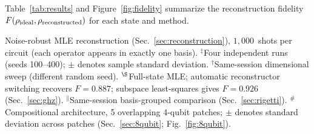 \documentclass[twocolumn,prx,aps,superscriptaddress,longbibliography,floatfix]{revtex4-2}
\begin{document}
Table~\ref{tab:results} and Figure~\ref{fig:fidelity} summarize the
reconstruction fidelity
$F(\rho_{\rm ideal}, \rho_{\rm reconstructed})$ for each state and
method.

\begin{table}[tb]
\centering
\caption{Reconstruction fidelity: structured vs.\ random Pauli selection
on superconducting hardware.  $M$ denotes the number of Pauli
\emph{operators} measured; under tensor-product basis grouping,
the circuit count is smaller (e.g., $137$ operators $\to 29$
$K^*$ bases or $\sim 50$ random bases at $n = 4$).
Each circuit uses $1{,}000$~shots.
Fidelity is Uhlmann fidelity
$F(\rho,\sigma) = (\mathrm{tr}\sqrt{\sqrt{\rho}\,\sigma\sqrt{\rho}})^2$.}
\label{tab:results}
\vspace{2pt}
{\footnotesize Noise-robust MLE reconstruction
(Sec.~\ref{sec:reconstruction}), $1{,}000$~shots per circuit
(each operator appears in exactly one basis).
$^\ddagger$Four independent runs (seeds 100--400);
$\pm$ denotes sample standard deviation.
$^\dagger$Same-session dimensional sweep (different random seed).
$^\S$Full-state MLE; automatic reconstructor switching recovers
$F = 0.887$; subspace least-squares gives $F = 0.926$
(Sec.~\ref{sec:ghz}).
$^\|$Same-session basis-grouped comparison
(Sec.~\ref{sec:rigetti}).
$^\#$Compositional architecture, 5 overlapping 4-qubit patches;
$\pm$ denotes standard deviation across patches
(Sec.~\ref{sec:8qubit}; Fig.~\ref{fig:8qubit}).}
\end{table}
\end{document}
